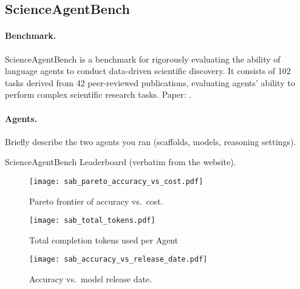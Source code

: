 \subsection{ScienceAgentBench}\label{app:scienceagentbench}

\paragraph{Benchmark.}
ScienceAgentBench is a benchmark for rigorously evaluating the ability of language agents to conduct data-driven scientific discovery. It consists of 102 tasks derived from 42 peer-reviewed publications, evaluating agents' ability to perform complex scientific research tasks.
Paper: \cite{scienceagentbench}.

\paragraph{Agents.}
Briefly describe the two agents you ran (scaffolds, models, reasoning settings).


\begin{table}[t]
  \centering
  \caption{ScienceAgentBench Leaderboard (verbatim from the website).}
  \label{tab:scienceagentbench_full}
  
\end{table}


\begin{figure}[htbp]
  \centering
  \texttt{[image: sab\_pareto\_accuracy\_vs\_cost.pdf]}
  \caption{Pareto frontier of accuracy vs.\ cost.}
  \label{fig:sab_pareto}
\end{figure}

\begin{figure}[htbp]
  \centering
  \texttt{[image: sab\_total\_tokens.pdf]}
  \caption{Total completion tokens used per Agent}
  \label{fig:sab_tokens}
\end{figure}

\begin{figure}[htbp]
  \centering
  \texttt{[image: sab\_accuracy\_vs\_release\_date.pdf]}
  \caption{Accuracy vs.\ model release date.}
  \label{fig:sab_release}
\end{figure}

\clearpage